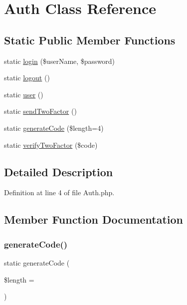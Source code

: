\hypertarget{class_auth}{}\section{Auth Class Reference}
\label{class_auth}
\subsection*{Static Public Member Functions}
\begin{DoxyCompactItemize}
\item 
static \hyperlink{class_auth_a5b58b727794a21b87e23d646eb9ddc6d}{login} (\$user\+Name, \$password)
\item 
static \hyperlink{class_auth_a1e34160e903835a43123f538e93457a2}{logout} ()
\item 
static \hyperlink{class_auth_a7949f68385a98a60ff42ea3c3a768ec7}{user} ()
\item 
static \hyperlink{class_auth_a630afde0cf1e1c509b51e8686c8312ac}{send\+Two\+Factor} ()
\item 
static \hyperlink{class_auth_aefee13cde7ae75c5e007f9e50f94b76c}{generate\+Code} (\$length=4)
\item 
static \hyperlink{class_auth_a44cd32430eda0860d3d5a4e4a210a106}{verify\+Two\+Factor} (\$code)
\end{DoxyCompactItemize}


\subsection{Detailed Description}


Definition at line 4 of file Auth.\+php.



\subsection{Member Function Documentation}
\hypertarget{class_auth_aefee13cde7ae75c5e007f9e50f94b76c}{}\label{class_auth_aefee13cde7ae75c5e007f9e50f94b76c} 
\subsubsection{\texorpdfstring{generate\+Code()}{generateCode()}}
{\footnotesize\ttfamily static generate\+Code (\begin{DoxyParamCaption}\item[{}]{\$length = {} }\end{DoxyParamCaption})\hspace{0.3cm}{\ttfamily [static]}}

